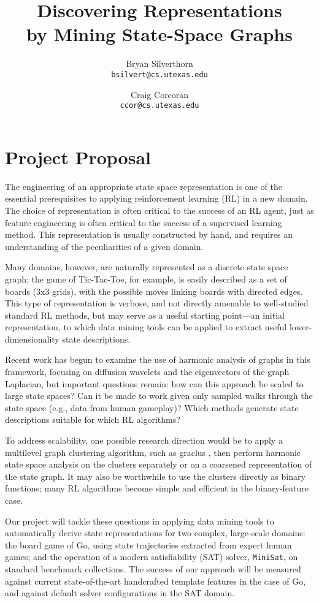 \documentclass{article}
\title{Discovering Representations\\by Mining State-Space Graphs}
\author{Bryan Silverthorn\\
\texttt{bsilvert@cs.utexas.edu}
\and Craig Corcoran\\
\texttt{ccor@cs.utexas.edu}}
\begin{document}
\maketitle

%
%

\section*{Project Proposal}

The engineering of an appropriate state space representation is one of the
essential prerequisites to applying reinforcement learning (RL) in a new
domain. The choice of representation is often critical to the success of an RL
agent, just as feature engineering is often critical to the success of a
supervised learning method. This representation is usually constructed by hand,
and requires an understanding of the peculiarities of a given domain.

Many domains, however, are naturally represented as a discrete state space
graph: the game of Tic-Tac-Toe, for example, is easily described as a set of
boards (3x3 grids), with the possible moves linking boards with directed edges.
This type of representation is verbose, and not directly amenable to
well-studied standard RL methods, but may serve as a useful starting point---an
initial representation, to which data mining tools can be applied to extract
useful lower-dimensionality state descriptions.

Recent work \citep{Wang2009Multiscale,Mahadevan2006Value,Coifman06Diffusion} has 
begun to examine the use of harmonic analysis of graphs in this framework, 
focusing on diffusion wavelets and the eigenvectors of the graph Laplacian, but 
important questions remain: how can this approach be scaled to large state spaces? 
Can it be made to work given only sampled walks through the state space (e.g., data 
from human gameplay)? Which methods generate state descriptions suitable for which 
RL algorithms?

To address scalability, one possible research direction would be to apply a
multilevel graph clustering algorithm, such as graclus
\citep{Dhillon07weightedgraph}, then perform harmonic state space analysis on
the clusters separately or on a coarsened representation of the state graph. It
may also be worthwhile to use the clusters directly as binary functions; many
RL algorithms become simple and efficient in the binary-feature case.  

Our project will tackle these questions in applying data mining tools to
automatically derive state representations for two complex, large-scale
domains: the board game of Go, using state trajectories extracted from expert
human games; and the operation of a modern satisfiability (SAT) solver,
\texttt{MiniSat}, on standard benchmark collections. The success of our
approach will be measured against current state-of-the-art handcrafted template
features \citep{Silver2007Shape} in the case of Go, and against default solver
configurations in the SAT domain. 

%
%



\end{document}
